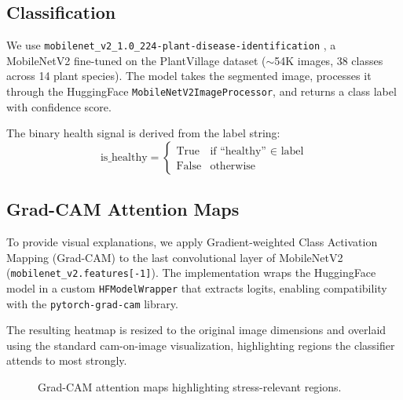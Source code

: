 \documentclass[11pt,a4paper,twocolumn]{article}
\begin{document}
\subsection{Classification}

We use \texttt{mobilenet\_v2\_1.0\_224-plant-disease-identification} \cite{sandler2018mobilenetv2}, a MobileNetV2 fine-tuned on the PlantVillage dataset ($\sim$54K images, 38 classes across 14 plant species). The model takes the segmented image, processes it through the HuggingFace \texttt{MobileNetV2ImageProcessor}, and returns a class label with confidence score.

The binary health signal is derived from the label string:
\begin{equation}
    \text{is\_healthy} = \begin{cases} \text{True} & \text{if ``healthy'' } \in \text{ label} \\ \text{False} & \text{otherwise} \end{cases}
\end{equation}

\subsection{Grad-CAM Attention Maps}

To provide visual explanations, we apply Gradient-weighted Class Activation Mapping (Grad-CAM) \cite{selvaraju2017gradcam} to the last convolutional layer of MobileNetV2 (\texttt{mobilenet\_v2.features[-1]}). The implementation wraps the HuggingFace model in a custom \texttt{HFModelWrapper} that extracts logits, enabling compatibility with the \texttt{pytorch-grad-cam} library.

The resulting heatmap is resized to the original image dimensions and overlaid using the standard cam-on-image visualization, highlighting regions the classifier attends to most strongly.

\begin{figure}[H]
    \centering
    \caption{Grad-CAM attention maps highlighting stress-relevant regions.}
    \label{fig:gradcam}
\end{figure}
\end{document}
